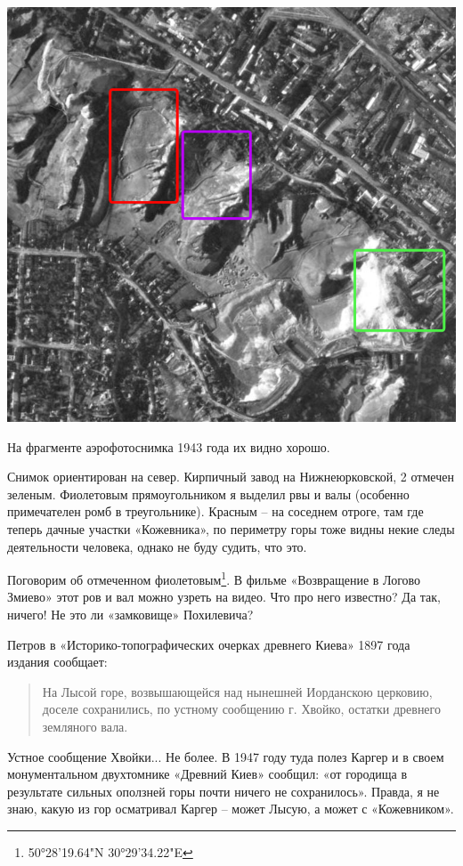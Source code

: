 \begin{center}
\includegraphics[width=\linewidth]{chast-kirvys/lys02/rvy-n.png}
\end{center}

На фрагменте аэрофотоснимка 1943 года их видно хорошо.

Снимок ориентирован на север. Кирпичный завод на Нижнеюрковской, 2 отмечен зеленым. Фиолетовым прямоугольником я выделил рвы и валы (особенно примечателен ромб в треугольнике). Красным – на соседнем отроге, там где теперь дачные участки «Кожевника», по периметру горы тоже видны некие следы деятельности человека, однако не буду судить, что это.

Поговорим об отмеченном фиолетовым\footnote{50°28'19.64"N 30°29'34.22"E}. В фильме «Возвращение в Логово Змиево» этот ров и вал можно узреть на видео. Что про него известно? Да так, ничего! Не это ли «замковище» Похилевича?

Петров в «Историко-топографических очерках древнего Киева» 1897 года издания сообщает:

\begin{quotation}
На Лысой горе, возвышающейся над нынешней Иорданскою церковию, доселе сохранились, по устному сообщению г. Хвойко, остатки древнего земляного вала.
\end{quotation}

Устное сообщение Хвойки... Не более. В 1947 году туда полез Каргер и в своем монументальном двухтомнике «Древний Киев» сообщил: «от городища в результате сильных оползней горы почти ничего не сохранилось». Правда, я не знаю, какую из гор осматривал Каргер – может Лысую, а может с «Кожевником».

